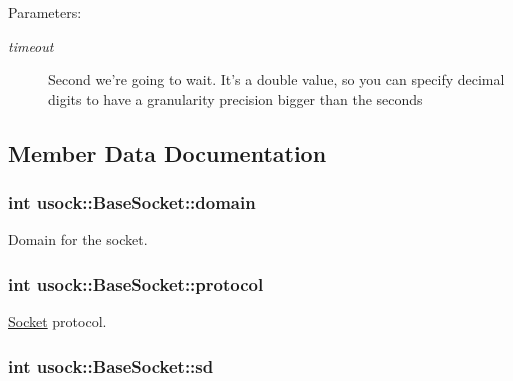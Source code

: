 \begin{Desc}
\item[Parameters:]
\begin{description}
\item[{\em timeout}]Second we're going to wait. It's a double value, so you can specify decimal digits to have a granularity precision bigger than the seconds \end{description}
\end{Desc}


\subsection{Member Data Documentation}
\hypertarget{classusock_1_1BaseSocket_9a7414d934aeccd1340292214a2aef0e}{
\subsubsection[{domain}]{\setlength{\rightskip}{0pt plus 5cm}int {\bf usock::BaseSocket::domain}}}
\label{classusock_1_1BaseSocket_9a7414d934aeccd1340292214a2aef0e}


Domain for the socket. 

\hypertarget{classusock_1_1BaseSocket_91b9f72f183b6314891f7e1f93ead99a}{
\subsubsection[{protocol}]{\setlength{\rightskip}{0pt plus 5cm}int {\bf usock::BaseSocket::protocol}}}
\label{classusock_1_1BaseSocket_91b9f72f183b6314891f7e1f93ead99a}


\hyperlink{classusock_1_1Socket}{Socket} protocol. 

\hypertarget{classusock_1_1BaseSocket_63b6c07fb14f937056148cbf8b3531c5}{
\subsubsection[{sd}]{\setlength{\rightskip}{0pt plus 5cm}int {\bf usock::BaseSocket::sd}}}
\label{classusock_1_1BaseSocket_63b6c07fb14f937056148cbf8b3531c5}



